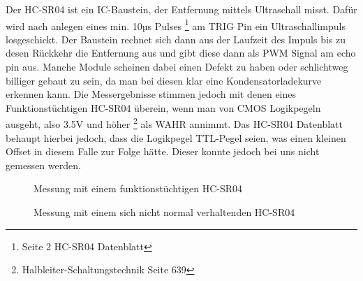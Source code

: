 \documentclass[12pt,a4paper]{article}
\begin{document}
	Der HC-SR04 ist ein IC-Baustein, der Entfernung mittels Ultraschall
	misst. Dafür wird nach anlegen eines min. 10µs Pulses
	\footnote{Seite 2 HC-SR04 Datenblatt}
	am TRIG Pin
	ein Ultraschallimpuls losgeschickt. Der Baustein rechnet sich dann aus
	der Laufzeit des Impuls bis zu desen Rückkehr die Entfernung aus und
	gibt diese dann als PWM Signal am echo pin aus. Manche
	Module scheinen dabei einen Defekt zu haben oder schlichtweg billiger
	gebaut zu sein, da man bei diesen klar eine Kondensatorladekurve
	erkennen kann. Die Messergebnisse stimmen jedoch mit denen eines
	Funktionstüchtigen HC-SR04 überein, wenn man von CMOS Logikpegeln
	ausgeht, also 3.5V und höher
	\footnote{Halbleiter-Schaltungstechnik Seite 639} als 
	WAHR annimmt. Das HC-SR04 Datenblatt behaupt hierbei jedoch, dass die
	Logikpegel TTL-Pegel seien, was einen kleinen Offset in diesem Falle
	zur Folge hätte. Dieser konnte jedoch bei uns nicht gemessen werden.
	

	\begin{figure}[H]
		
		\centering
		\label{fig:hc-sr04_working}

		\caption{Messung mit einem funktionstüchtigen HC-SR04}
	\end{figure}
	
	\begin{figure}[H]
		
		\centering
		\label{fig:hc-sr04_broken}

		\caption{Messung mit einem sich nicht normal verhaltenden 
			HC-SR04}
	\end{figure}
\end{document}
